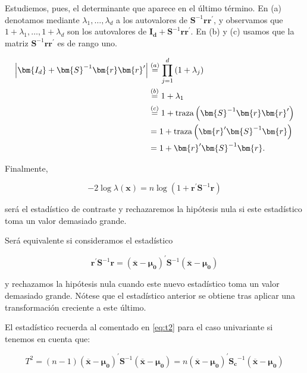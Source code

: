 \documentclass[
  a4paper,
  oneside]{scrbook}
\theoremstyle{definition}
\theoremstyle{definition}
\theoremstyle{definition}
\theoremstyle{definition}
\theoremstyle{remark}
\begin{document}
Estudiemos, pues, el determinante que aparece en el último término. En
(a) denotamos mediante \(\lambda_1,\ldots,\lambda_d\) a los autovalores de
\(\bm{S}^{-1}\bm{r}\bm{r}^\prime{}\), y observamos que
\(1+\lambda_1,\ldots,1+\lambda_d\) son los autovalores de
\(\bm{I_d}+\bm{S}^{-1}\bm{r}\bm{r}^\prime{}\). En (b) y (c) usamos que la
matriz \(\bm{S}^{-1}\bm{r}\bm{r}^\prime{}\) es de rango uno.

\[
\begin{aligned}
\left|\bm{I_d}+\bm{S}^{-1}\bm{r}\bm{r}^\prime{}\right|&\stackrel{(a)}{=}
\prod_{j=1}^d \left(1+\lambda_j\right)\\
&\stackrel{(b)}{=}
1+\lambda_1\\
&\stackrel{(c)}{=}
1+{\textnormal{traza}}\left(\bm{S}^{-1}\bm{r}\bm{r}^\prime{}\right)\\
&=1+{\textnormal{traza}}\left(\bm{r}^\prime{}\bm{S}^{-1}\bm{r}\right)\\
&=1+\bm{r}^\prime{}\bm{S}^{-1}\bm{r}.
\end{aligned}\]

Finalmente,

\[-2\log \lambda(\bm{x})=n\log\left(1+\bm{r}^\prime{}\bm{S}^{-1}\bm{r}\right)\]

será el estadístico de contraste y rechazaremos la hipótesis nula si
este estadístico toma un valor demasiado grande.

Será equivalente si consideramos el estadístico

\[\bm{r}^\prime{}\bm{S}^{-1}\bm{r}=\left(\overline{\bm{x}}-\bm{\mu_0}\right)^\prime{} \bm{S}^{-1} \left(\overline{\bm{x}}-\bm{\mu_0}\right)\]

y rechazamos la hipótesis nula cuando este nuevo estadístico toma un
valor demasiado grande. Nótese que el estadístico anterior se obtiene
tras aplicar una transformación creciente a este último.

El estadístico recuerda al comentado en \eqref{eq:t2} para el caso
univariante si tenemos en cuenta que:

\[T^2=(n-1)\left(\overline{\bm{x}}-\bm{\mu_0}\right)^\prime{} \bm{S}^{-1} \left(\overline{\bm{x}}-\bm{\mu_0}\right)=n\left(\overline{\bm{x}}-\bm{\mu_0}\right)^\prime{} \bm{S_c}^{-1} \left(\overline{\bm{x}}-\bm{\mu_0}\right)\]
\end{document}
